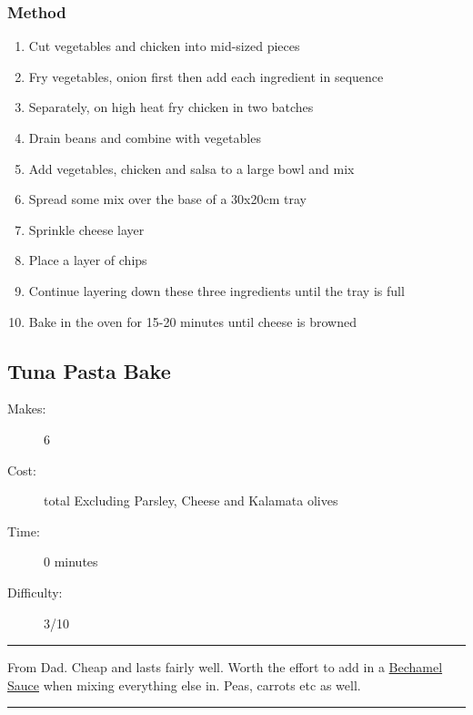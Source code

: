\documentclass[]{article}
\begin{document}
\subsubsection*{\Large Method}
\begin{enumerate}[font=\huge\color{accent}]
	\item Cut vegetables and chicken into mid-sized pieces
	\item Fry vegetables, onion first then add each ingredient in sequence
	\item Separately, on high heat fry chicken in two batches
	\item Drain beans and combine with vegetables
	\item Add vegetables, chicken and salsa to a large bowl and mix
	\item Spread some mix over the base of a 30x20cm tray
	\item Sprinkle cheese layer
	\item Place a layer of chips
	\item Continue layering down these three ingredients until the tray is full
	\item Bake in the oven for 15-20 minutes until cheese is browned
\end{enumerate}
\newpage
{}\label{rec:Tuna Pasta Bake}
\subsection*{\center\huge Tuna Pasta Bake}
\begin{description}
\item[Makes:] 6 
\item[Cost:]  total Excluding Parsley, Cheese and Kalamata olives
\item[Time:] 0 minutes
\item[Difficulty:] 3/10
\end{description}
\vspace{0.2cm}\hrule\vspace{0.5cm}
\begin{adjustwidth}{0.5 cm}{0.5 cm}

From Dad. Cheap and lasts fairly well. Worth the effort to add in a \hyperref[rec:Bechamel]{Bechamel Sauce} when mixing everything else in. Peas, carrots etc as well. \hfill{}\color{black}

\end{adjustwidth}
\vspace{0.5cm}\hrule
\end{document}
